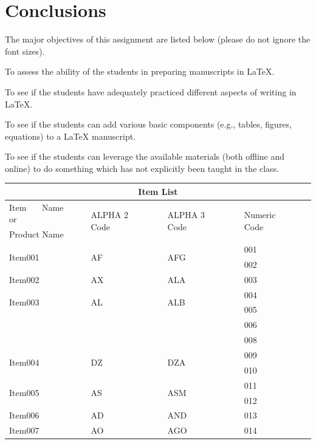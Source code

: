 \documentclass[12pt, a4paper]{article}
\begin{document}
	\section{Conclusions}
	The major objectives of this assignment are listed below (please do not ignore
	the font sizes).
	\begin{itemize}
		\item {\Large To assess the ability of the students in preparing
			manuscripts in \LaTeX.}
		 {\Large \item} {\large To see if the students have adequately practiced different
			aspects of writing in \LaTeX.}
		{\large \item} To see if the students can add various basic components (e.g., tables,
		figures, equations) to a {\LaTeX} manuscript.
		\item {\small To see if the students can leverage the available materials (both offline and
			online) to do something which has not explicitly been taught in the class.}
	\end{itemize}
	
	\begin{table}[b]
		\begin{tabular}{|l||l|l|l|}
			\hline
			\multicolumn{4}{|c|}{Item List}\\
			\hline
			Item~~~ Name~~~ or  &\multirow{2}{*}{ALPHA 2 Code~~~} &\multirow{2}{*}{ALPHA 3 Code~~~} &\multirow{2}{*}{Numeric Code~~~} \\
			Product Name & & & \\
			\hline
			\multirow{2}{*}{Item001} & \multirow{2}{*}{AF} & \multirow{2}{*}{AFG} & 001\\
			& & & 002 \\
			\hline
			Item002& AX &ALA &003\\
			\hline
			\multirow{2}{*}{Item003} & \multirow{2}{*}{AL} & \multirow{2}{*}{ALB} & 004\\
			& & & 005 \\
			& & & 006 \\
			& & & 008 \\
			\hline
			\multirow{2}{*}{Item004} & \multirow{2}{*}{DZ} & \multirow{2}{*}{DZA} & 009\\
			& & & 010 \\
			\hline
			\multirow{2}{*}{Item005} & \multirow{2}{*}{AS} & \multirow{2}{*}{ASM} & 011\\
			& & & 012 \\
			\hline
			Item006 & AD & AND & 013\\
			\hline
			Item007& AO& AGO& 014\\
			\hline
			\hline
		\end{tabular}
	\end{table}
	
\end{document}
